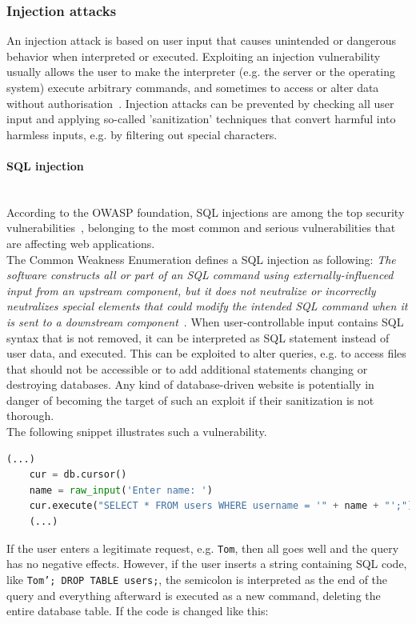 \documentclass[
a4paper,
pagesize,
pdftex,
12pt,
twoside, %
BCOR=5mm, %
ngerman,
fleqn,
final,
]{scrartcl}
\begin{document}
	\subsubsection{Injection attacks}
	An injection attack is based on user input that causes unintended or dangerous behavior when interpreted or executed. Exploiting an injection vulnerability usually allows the user to make the interpreter (e.g. the server or the operating system) execute arbitrary commands, and sometimes to access or alter data without authorisation~\cite{Micheelsen.2016}. Injection attacks can be prevented by checking all user input and applying so-called 'sanitization' techniques that convert harmful into harmless inputs, e.g. by filtering out special characters. 
	\paragraph{SQL injection}\mbox{}\\
	According to the OWASP foundation, SQL injections are among the top security vulnerabilities~\cite{OWASPFoundation.}, belonging to the most common and serious vulnerabilities that are affecting web applications.\\ 
	The Common Weakness Enumeration defines a SQL injection as following: \textit{The software constructs all or part of an SQL command using externally-influenced input from an upstream component, but it does not neutralize or incorrectly neutralizes special elements that could modify the intended SQL command when it is sent to a downstream component}~\cite{CommonWeaknessEnumeration.19.9.2019}. When user-controllable input contains SQL syntax that is not removed, it can be interpreted as SQL statement instead of user data, and executed. This can be exploited to alter queries, e.g. to access files that should not be accessible or to add additional statements changing or destroying databases. Any kind of database-driven website is potentially in danger of becoming the target of such an exploit if their sanitization is not thorough.\\
	The following snippet illustrates such a vulnerability.
	\begin{lstlisting}[language=Python,showstringspaces=false]
	(...)
	cur = db.cursor()
	name = raw_input('Enter name: ')
	cur.execute("SELECT * FROM users WHERE username = '" + name + "';")
	(...)
	\end{lstlisting}
	If the user enters a legitimate request, e.g. \texttt{Tom}, then all goes well and the query has no negative effects. However, if the user inserts a string containing SQL code, like \texttt{Tom'; DROP TABLE users;}, the semicolon is interpreted as the end of the query and everything afterward is executed as a new command, deleting the entire database table. If the code is changed like this:
\end{document}
